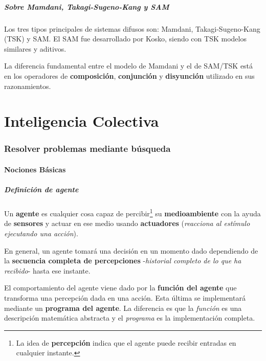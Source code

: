 \documentclass[10pt,a4paper]{article}
\begin{document}
\subsubsection{Sobre Mamdani, Takagi-Sugeno-Kang y SAM}

Los tres tipos principales de sistemas difusos son: Mamdani, Takagi-Sugeno-Kang (TSK) y SAM. El SAM fue desarrollado por Kosko, siendo con TSK modelos similares y aditivos.

La diferencia fundamental entre el modelo de Mamdani y el de SAM/TSK está en los operadores de \textbf{composición}, \textbf{conjunción} y \textbf{disyunción} utilizado en sus razonamientos.

\pagebreak
\part{Inteligencia Colectiva}
\setcounter{section}{0}

\section{Resolver problemas mediante búsqueda}

\subsection{Nociones Básicas}

\subsubsection{Definición de agente}

Un \textbf{agente} es cualquier cosa capaz de percibir\footnote{La idea de \textbf{percepción} indica que el agente puede recibir entradas en cualquier instante.} su \textbf{medioambiente} con la ayuda de \textbf{sensores} y actuar en ese medio usando \textbf{actuadores} (\textit{reacciona al estímulo ejecutando una acción}).

En general, un agente tomará una decisión en un momento dado dependiendo de la \textbf{secuencia completa de percepciones} -\textit{historial completo de lo que ha recibido}- hasta ese instante.

El comportamiento del agente viene dado por la \textbf{función del agente} que transforma una percepción dada en una acción. Esta última se implementará mediante un \textbf{programa del agente}. La diferencia es que la \textit{función} es una descripción matemática abstracta y el \textit{programa} es la implementación completa.
\end{document}

